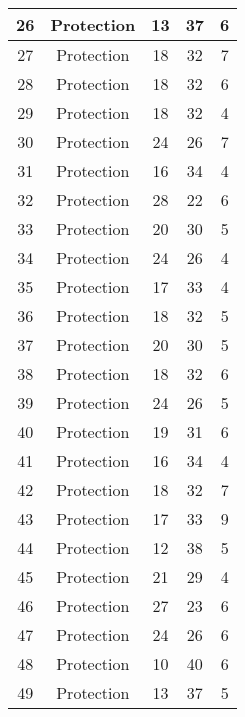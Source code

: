 \documentclass[results.tex]{subfiles}
\begin{document}
\begin{center}
\begin{tabular}{| c || c | c | c | c |}
    \hline
    26 & Protection & 13 & 37 & 6 \\ 
    \hline
    27 & Protection & 18 & 32 & 7 \\ 
    \hline
    28 & Protection & 18 & 32 & 6 \\ 
    \hline
    29 & Protection & 18 & 32 & 4 \\ 
    \hline
    30 & Protection & 24 & 26 & 7 \\ 
    \hline
    31 & Protection & 16 & 34 & 4 \\ 
    \hline
    32 & Protection & 28 & 22 & 6 \\ 
    \hline
    33 & Protection & 20 & 30 & 5 \\ 
    \hline
    34 & Protection & 24 & 26 & 4 \\ 
    \hline
    35 & Protection & 17 & 33 & 4 \\ 
    \hline
    36 & Protection & 18 & 32 & 5 \\ 
    \hline
    37 & Protection & 20 & 30 & 5 \\ 
    \hline
    38 & Protection & 18 & 32 & 6 \\ 
    \hline
    39 & Protection & 24 & 26 & 5 \\ 
    \hline
    40 & Protection & 19 & 31 & 6 \\ 
    \hline
    41 & Protection & 16 & 34 & 4 \\ 
    \hline
    42 & Protection & 18 & 32 & 7 \\ 
    \hline
    43 & Protection & 17 & 33 & 9 \\ 
    \hline
    44 & Protection & 12 & 38 & 5 \\ 
    \hline
    45 & Protection & 21 & 29 & 4 \\ 
    \hline
    46 & Protection & 27 & 23 & 6 \\ 
    \hline
    47 & Protection & 24 & 26 & 6 \\ 
    \hline
    48 & Protection & 10 & 40 & 6 \\ 
    \hline
    49 & Protection & 13 & 37 & 5 \\ 
    \hline   \end{tabular}
\end{center}
\end{document}
